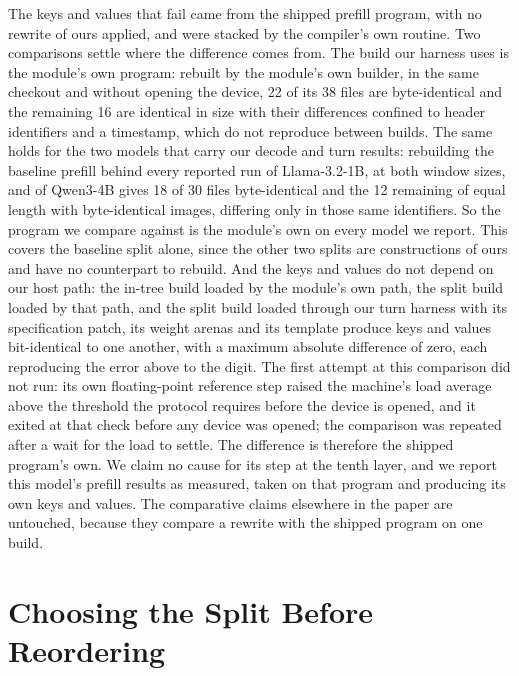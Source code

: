 The keys and values that fail came from the shipped prefill program, with no rewrite of ours applied, and were
stacked by the compiler's own routine. Two comparisons settle where the difference comes from. The build our harness
uses is the module's own program: rebuilt by the module's own builder, in the same checkout and without opening the
device, 22 of its 38 files are byte-identical and the remaining 16 are identical in size with their differences
confined to header identifiers and a timestamp, which do not reproduce between builds. The same holds for the two
models that carry our decode and turn results: rebuilding the baseline prefill behind every reported run of
Llama-3.2-1B, at both window sizes, and of Qwen3-4B gives 18 of 30 files byte-identical and the 12 remaining of equal
length with byte-identical images, differing only in those same identifiers. So the program we compare against is the
module's own on every model we report. This covers the baseline split alone, since the other two splits are
constructions of ours and have no counterpart to rebuild. And the keys and values do not
depend on our host path: the in-tree build loaded by the module's own path, the split build loaded by that path, and
the split build loaded through our turn harness with its specification patch, its weight arenas and its template
produce keys and values bit-identical to one another, with a maximum absolute difference of zero, each reproducing
the error above to the digit. The first attempt at this comparison did not run: its own floating-point reference step raised the machine's
load average above the threshold the protocol requires before the device is opened, and it exited at that check
before any device was opened; the comparison was repeated after a wait for the load to settle.
The difference is therefore the shipped program's own. We claim no cause for its step at
the tenth layer, and we report this model's prefill results as measured, taken on that program and producing its own
keys and values. The comparative claims elsewhere in the paper are untouched, because they compare a rewrite with the
shipped program on one build.

\section{Choosing the Split Before Reordering}
\label{app:split-first}

